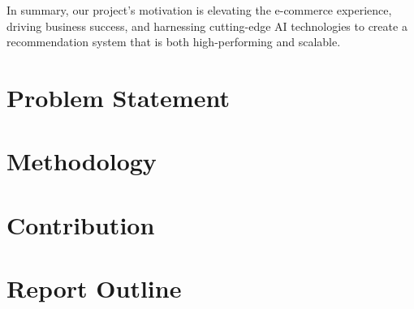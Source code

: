 In summary, our project's motivation is elevating the e-commerce experience, driving business success, and harnessing cutting-edge AI technologies to create a recommendation system that is both high-performing and scalable.

\section{Problem Statement}

\section{Methodology}

\section{Contribution}

\section{Report Outline}

